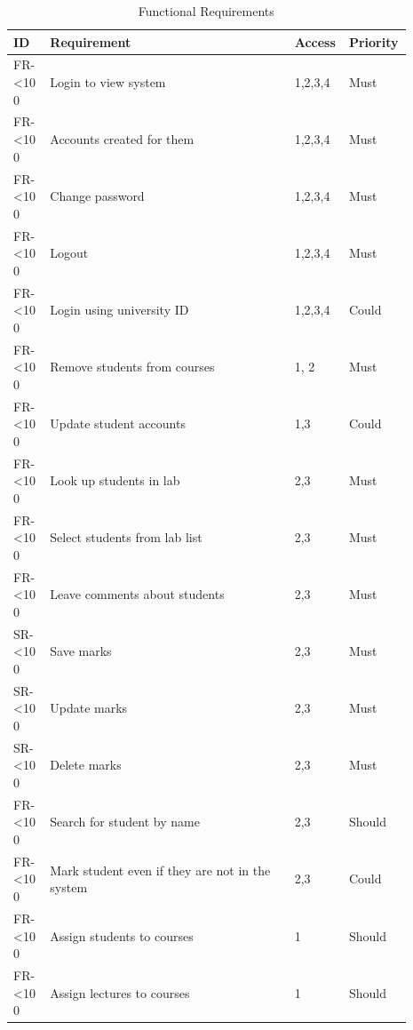 \documentclass[11pt]{report}
\newcommand{\rid}[1]{\centering #1-\ifnum\value{requirement}<10 0\fi\arabic{requirement}
\stepcounter{requirement}}
\begin{document}
\begin{spacing}{1.1}
\begin{longtable}{|p{0.09\linewidth}|p{0.6\linewidth}|p{0.1\linewidth}|
p{0.1\linewidth}|}
\caption{Functional Requirements} \label{table:eval-funct-user} \\ \hline
\textbf{ID} & \textbf{Requirement} & \textbf{Access} & \textbf{Priority}\\
\hline \hline

\rowcolor{Green} \rid{FR} &  Login to view system & 1,2,3,4 & Must\\ \hline
\rowcolor{Green} \rid{FR} &  Accounts created for them & 1,2,3,4 & Must\\ \hline
\rowcolor{Red} \rid{FR} &  Change password & 1,2,3,4 & Must\\ \hline
\rowcolor{Green} \rid{FR} &  Logout & 1,2,3,4 & Must \\ \hline
\rowcolor{Yellow} \rid{FR} &  Login using university ID & 1,2,3,4 & Could\\ \hline

\rowcolor{Green} \rid{FR} &  Remove students from courses & 1, 2 & Must\\ \hline
\rowcolor{Yellow} \rid{FR} &  Update student accounts & 1,3 & Could \\ \hline

\rowcolor{Green} \rid{FR} &  Look up students in lab & 2,3 & Must\\ \hline
\rowcolor{Green} \rid{FR} &  Select students from lab list & 2,3 & Must\\ \hline
\rowcolor{Green} \rid{FR} &  Leave comments about students & 2,3 & Must\\ \hline
\rowcolor{Green} \rid{SR} &  Save marks & 2,3 & Must\\ \hline
\rowcolor{Green} \rid{SR} &  Update marks & 2,3 & Must\\ \hline
\rowcolor{Red} \rid{SR} &  Delete marks & 2,3 & Must\\ \hline
\rowcolor{Green} \rid{FR} &  Search for student by name & 2,3 & Should\\ \hline
\rowcolor{Yellow} \rid{FR} &  Mark student even if they are not in the system & 2,3 & Could \\ \hline

\rowcolor{Green} \rid{FR} &  Assign students to courses & 1 & Should\\ \hline
\rowcolor{Green} \rid{FR} &  Assign lectures to courses & 1 & Should\\ \hline


\end{longtable}
\end{spacing}
\end{document}
